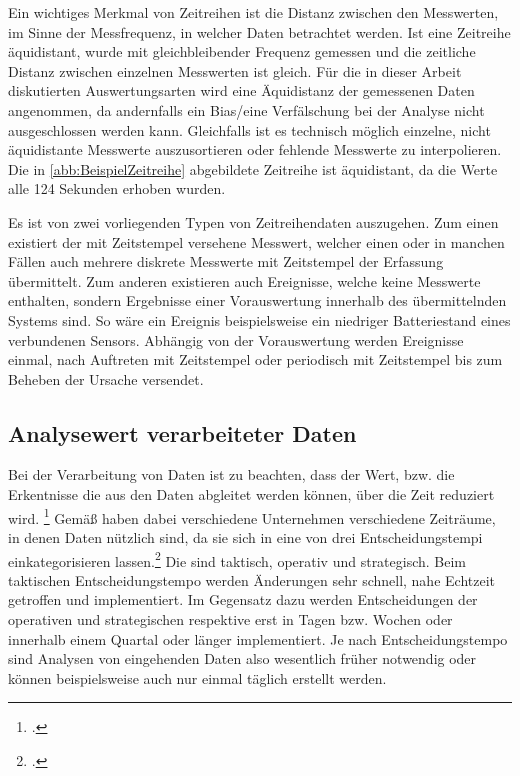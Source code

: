 Ein wichtiges Merkmal von Zeitreihen ist die Distanz zwischen den Messwerten, im Sinne der Messfrequenz, in welcher Daten betrachtet werden.  Ist eine Zeitreihe äquidistant, wurde mit gleichbleibender Frequenz gemessen und die zeitliche Distanz zwischen einzelnen Messwerten ist gleich. Für die in dieser Arbeit diskutierten Auswertungsarten wird eine Äquidistanz der gemessenen Daten angenommen, da andernfalls ein Bias/eine Verfälschung bei der Analyse nicht ausgeschlossen werden kann. Gleichfalls ist es technisch möglich einzelne, nicht äquidistante Messwerte auszusortieren oder fehlende Messwerte zu interpolieren. Die in \autoref{abb:BeispielZeitreihe} abgebildete Zeitreihe ist äquidistant, da die Werte alle 124 Sekunden erhoben wurden.

Es ist von zwei vorliegenden Typen von Zeitreihendaten auszugehen. Zum einen existiert der mit Zeitstempel versehene Messwert, welcher einen oder in manchen Fällen auch mehrere diskrete Messwerte mit Zeitstempel der Erfassung übermittelt. 
Zum anderen existieren auch Ereignisse, welche keine Messwerte enthalten, sondern Ergebnisse einer Vorauswertung innerhalb des übermittelnden Systems sind. 
So wäre ein Ereignis beispielsweise ein niedriger Batteriestand eines verbundenen Sensors. 
Abhängig von der Vorauswertung werden Ereignisse einmal, nach Auftreten mit Zeitstempel oder periodisch mit Zeitstempel bis zum Beheben der Ursache versendet. 

\subsection{Analysewert verarbeiteter Daten}

Bei der Verarbeitung von Daten ist zu beachten, dass der Wert, bzw. die Erkentnisse die aus den Daten abgleitet werden können, über die Zeit reduziert wird. \footcite[Vgl. auch im Folgenden][]{NucleusResarchInc..2012} Gemäß \citeauthor{NucleusResarchInc..2012} haben dabei verschiedene Unternehmen verschiedene Zeiträume, in denen Daten nützlich sind, da sie sich in eine von drei Entscheidungstempi einkategorisieren lassen.\footcite[Vgl. auch im Folgenden][3]{NucleusResarchInc..2012} Die  sind taktisch, operativ und strategisch. Beim taktischen Entscheidungstempo werden Änderungen sehr schnell, nahe Echtzeit getroffen und implementiert. Im Gegensatz dazu werden Entscheidungen der operativen und strategischen  respektive erst in Tagen bzw. Wochen oder innerhalb einem Quartal oder länger implementiert. Je nach Entscheidungstempo sind Analysen von eingehenden Daten also wesentlich früher notwendig oder können beispielsweise auch nur einmal täglich erstellt werden.

